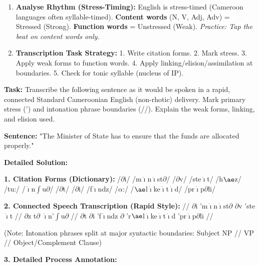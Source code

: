 \documentclass[11pt]{article}
\newcommand{\cle}[1]{{\popxbold\color{popdark}#1}}
\begin{document}
\begin{methode}
\begin{enumerate}
    \item \textbf{Analyse \cle{Rhythm} (Stress-Timing):} English is \cle{stress-timed} (Cameroon languages often \cle{syllable-timed}). \textbf{Content words} (N, V, Adj, Adv) = \cle{Stressed} (Strong). \textbf{Function words} = \cle{Unstressed} (Weak). \emph{Practice: Tap the beat on content words only.}
    \item \textbf{Transcription Task Strategy:} 1. Write citation forms. 2. Mark stress. 3. Apply weak forms to function words. 4. Apply linking/elision/assimilation at boundaries. 5. Check for \cle{tonic syllable} (nucleus of IP).
\end{enumerate}
\end{methode}

\begin{exoresolu}
\textbf{Task:} Transcribe the following sentence as it would be spoken in a rapid, connected Standard Cameroonian English (non-rhotic) delivery. Mark primary stress (') and intonation phrase boundaries (//). Explain the weak forms, linking, and elision used.

\textbf{Sentence:} "The Minister of State has to ensure that the funds are allocated properly."

\tcblower
\textbf{Detailed Solution:}

\textbf{1. Citation Forms (Dictionary):}
/$\partial$i/ /m$\mathrm{\dot{\imath}}$n$\mathrm{\dot{\imath}}$st$\partial$/ /$\partial$v/ /ste$\mathrm{\dot{\imath}}$t/ /h$\ae$z/ /tu:/ /$\mathrm{\dot{\imath}}$n$\int$u$\partial$/ /$\partial$t/ /$\partial$i/ /f$\mathrm{\dot{\imath}}$ndz/ /$\alpha$:/ /$\ae$l$\mathrm{\dot{\imath}}$ke$\mathrm{\dot{\imath}}$t$\mathrm{\dot{\imath}}$d/ /pr$\mathrm{\dot{\imath}}$p$\partial$li/

\textbf{2. Connected Speech Transcription (Rapid Style):}
// $\partial$i 'm$\mathrm{\dot{\imath}}$n$\mathrm{\dot{\imath}}$st$\partial$ $\partial$v 'ste$\mathrm{\dot{\imath}}$t // $\partial$z t$\partial$ $\mathrm{\dot{\imath}}$n'$\int$u$\partial$ // $\partial$t $\partial$i 'f$\mathrm{\dot{\imath}}$ndz $\partial$ 'r$\ae$l$\mathrm{\dot{\imath}}$ke$\mathrm{\dot{\imath}}$t$\mathrm{\dot{\imath}}$d 'pr$\mathrm{\dot{\imath}}$p$\partial$li //\par
(Note: Intonation phrases split at major syntactic boundaries: Subject NP // VP // Object/Complement Clause)

\textbf{3. Detailed Process Annotation:}


\end{exoresolu}
\end{document}
